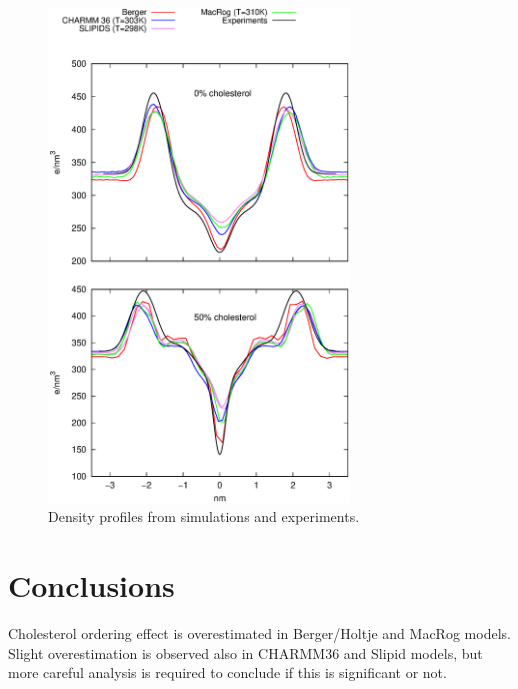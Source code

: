 \documentclass[aps,prl,superscriptaddress,twocolumn]{revtex4}
\begin{document}
  \begin{figure}[]
  \centering
  \includegraphics[width=8cm]{../FIGS/densitiesEXTREMES.eps}
  \caption{\label{densities}
    Density profiles from simulations and experiments.
  }
\end{figure}



\section{Conclusions}

Cholesterol ordering effect is overestimated in Berger/Holtje and MacRog models.
Slight overestimation is observed also in CHARMM36 and Slipid models, but more
careful analysis is required to conclude if this is significant or not.



%

\begin{acknowledgments}
\end{acknowledgments}




\listoftodos
\end{document}
